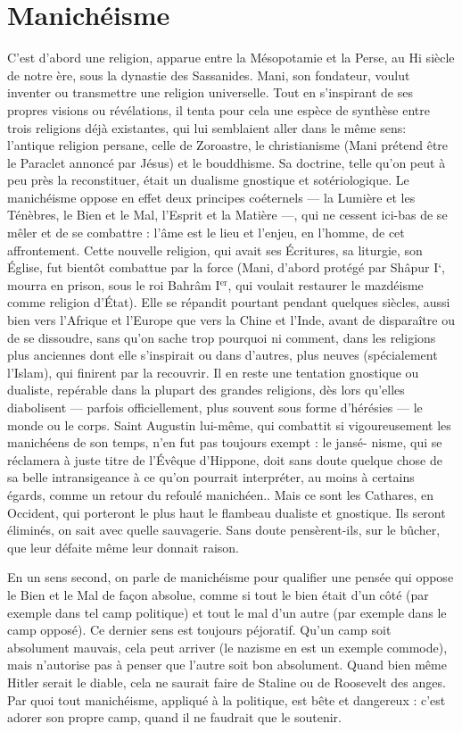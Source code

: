 \section{Manichéisme}
C'est d’abord une religion, apparue entre la Mésopotamie
et la Perse, au Hi siècle de notre ère, sous la dynastie des
Sassanides. Mani, son fondateur, voulut inventer ou transmettre une religion
universelle. Tout en s’inspirant de ses propres visions ou révélations, il tenta
pour cela une espèce de synthèse entre trois religions déjà existantes, qui lui
semblaient aller dans le même sens: l’antique religion persane, celle de
Zoroastre, le christianisme (Mani prétend être le Paraclet annoncé par Jésus)
et le bouddhisme. Sa doctrine, telle qu’on peut à peu près la reconstituer,
était un dualisme gnostique et sotériologique. Le manichéisme oppose en
effet deux principes coéternels — la Lumière et les Ténèbres, le Bien et le Mal,
l'Esprit et la Matière —, qui ne cessent ici-bas de se mêler et de se combattre :
l’âme est le lieu et l’enjeu, en l’homme, de cet affrontement. Cette nouvelle
religion, qui avait ses Écritures, sa liturgie, son Église, fut bientôt combattue
par la force (Mani, d’abord protégé par Shâpur I‘, mourra en prison, sous le
roi Bahrâm I$^\text{er}$, qui voulait restaurer le mazdéisme comme religion d’État).
Elle se répandit pourtant pendant quelques siècles, aussi bien vers l'Afrique
et l’Europe que vers la Chine et l’Inde, avant de disparaître ou de se dissoudre,
sans qu’on sache trop pourquoi ni comment, dans les religions plus
anciennes dont elle s’inspirait ou dans d’autres, plus neuves (spécialement
l'Islam), qui finirent par la recouvrir. Il en reste une tentation gnostique ou
dualiste, repérable dans la plupart des grandes religions, dès lors qu’elles diabolisent
— parfois officiellement, plus souvent sous forme d’hérésies — le
monde ou le corps. Saint Augustin lui-même, qui combattit si vigoureusement
les manichéens de son temps, n’en fut pas toujours exempt : le jansé-
nisme, qui se réclamera à juste titre de l’Évêque d’Hippone, doit sans doute
quelque chose de sa belle intransigeance à ce qu’on pourrait interpréter, au
moins à certains égards, comme un retour du refoulé manichéen.. Mais ce
sont les Cathares, en Occident, qui porteront le plus haut le flambeau dualiste
et gnostique. Ils seront éliminés, on sait avec quelle sauvagerie. Sans
doute pensèrent-ils, sur le bûcher, que leur défaite même leur donnait
raison.

En un sens second, on parle de manichéisme pour qualifier une pensée
qui oppose le Bien et le Mal de façon absolue, comme si tout le bien était
d’un côté (par exemple dans tel camp politique) et tout le mal d’un autre (par
exemple dans le camp opposé). Ce dernier sens est toujours péjoratif. Qu'un
camp soit absolument mauvais, cela peut arriver (le nazisme en est un
exemple commode), mais n’autorise pas à penser que l’autre soit bon absolument.
Quand bien même Hitler serait le diable, cela ne saurait faire de Staline
ou de Roosevelt des anges. Par quoi tout manichéisme, appliqué à la
politique, est bête et dangereux : c’est adorer son propre camp, quand il ne
faudrait que le soutenir.

